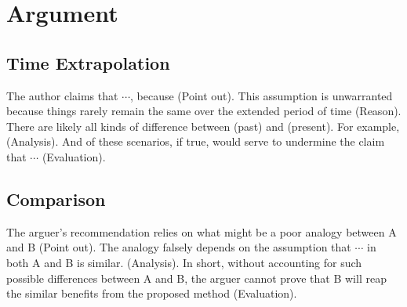 \section{Argument}
\subsection{Time Extrapolation}
The author claims that \(\cdots\), because ({\color{red}Point out}).
This assumption is unwarranted because things rarely remain the same over the extended period of time ({\color{red}Reason}).
There are likely all kinds of difference between (past) and (present).
For example, ({\color{red}Analysis}).
And of these scenarios, if true, would serve to undermine the claim that \(\cdots\) ({\color{red}Evaluation}).

\subsection{Comparison}
The arguer's recommendation relies on what might be a poor analogy between A and B ({\color{red}Point out}).
The analogy falsely depends on the assumption that \(\cdots\) in both A and B is similar.
({\color{red}Analysis}).
In short, without accounting for such possible differences between A and B, the arguer cannot prove that B will reap the similar benefits from the proposed method ({\color{red}Evaluation}).